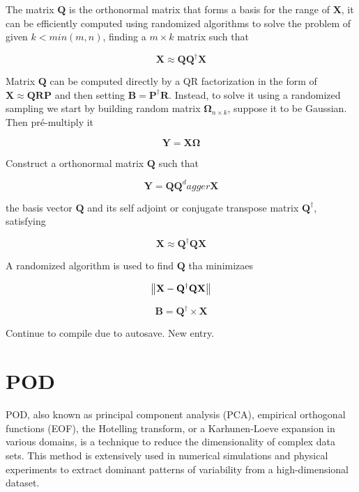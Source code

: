 The matrix $\mathbf{Q}$ is the orthonormal matrix that forms a basis for the range of $\mathbf{X}$, it can be efficiently computed using randomized algorithms to solve the problem of given $k < min(m,n)$, finding a $m \times k$ matrix such that

\begin{equation}
    \mathbf{X} \approx \mathbf{Q} \mathbf{Q}^\dagger \mathbf{X}
\end{equation}

Matrix $\mathbf{Q}$ can be computed directly by a QR factorization in the form of $\mathbf{X} \approx \mathbf{Q}\mathbf{R}\mathbf{P}$ and then setting $\mathbf{B} = \mathbf{P}^\dagger \mathbf{R}$. Instead, to solve it using a randomized sampling we start by building random matrix $\mathbf{\Omega}_{n \times k}$, suppose it to be Gaussian. Then pré-multiply it

\begin{equation}
    \mathbf{Y} = \mathbf{X} \mathbf{\Omega}
\end{equation}

Construct a orthonormal matrix $\mathbf{Q}$ such that

\begin{equation}
    \mathbf{Y} = \mathbf{Q} \mathbf{Q}^dagger \mathbf{X}
\end{equation}

the basis vector $\mathbf{Q}$ and its self adjoint or conjugate transpose matrix $\mathbf{Q}^{\dagger}$, satisfying

\begin{equation}
    \mathbf{X} \approx \mathbf{Q}^{\dagger} \mathbf{Q} \mathbf{X}
\end{equation}

A randomized algorithm is used to find $\mathbf{Q}$ tha minimizaes

\begin{equation}
    \norm{\mathbf{X} - \mathbf{Q}^{\dagger} \mathbf{Q} \mathbf{X}} 
\end{equation}

\begin{equation}
    \mathbf{B} = \mathbf{Q}^{\dagger} \times \mathbf{X}
\end{equation}

Continue to compile due to autosave. New entry. 

\section{POD}

POD, also known as principal component analysis (PCA), empirical orthogonal functions (EOF), the Hotelling transform, or a Karhunen-Loeve expansion in various domains, is a technique to reduce the dimensionality of complex data sets. This method is extensively used in numerical simulations and physical experiments to extract dominant patterns of variability from a high-dimensional dataset.

